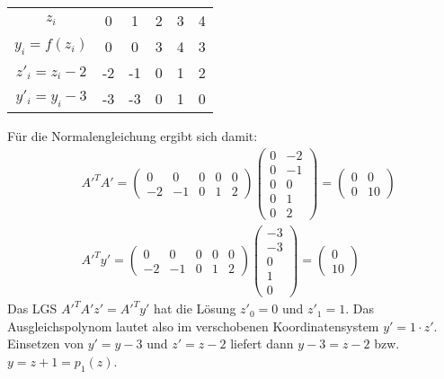 \begin{tabular}{c|ccccc}
  $z_i$ & 0 & 1 & 2 & 3 & 4\\
  $y_i = f(z_i)$ & 0 & 0 & 3 & 4 & 3 \\
  \hline
  $z'_i = z_i - 2$ & -2 & -1 & 0 & 1 & 2\\
  $y'_i = y_i - 3$ & -3 & -3 & 0 & 1 & 0
\end{tabular} \quad
Für die Normalengleichung ergibt sich damit:
\begin{align*}
  & A'^T A' =  \begin{pmatrix} 0 & 0 & 0 & 0 & 0 \\ -2 & -1 & 0 & 1 & 2 \end{pmatrix}
   \begin{pmatrix} 0 & -2 \\ 0 & -1 \\ 0 & 0 \\ 0 & 1 \\ 0 & 2 \end{pmatrix} =
   \begin{pmatrix} 0 & 0  \\ 0 & 10 \end{pmatrix} \\
  & A'^T y'= \begin{pmatrix} 0 & 0 & 0 & 0 & 0 \\ -2 & -1 & 0 & 1 & 2 \end{pmatrix}
   \begin{pmatrix} -3 \\ -3 \\ 0 \\ 1 \\ 0 \end{pmatrix} = \begin{pmatrix}0 \\10 \end{pmatrix}
\end{align*}
Das LGS $A'^T A' z' = A'^T y'$ hat die Lösung $z'_0 = 0$ und $z'_1 = 1$. Das
Ausgleichspolynom lautet also im verschobenen Koordinatensystem $y' = 1 \cdot z'$.
Einsetzen von $y' = y - 3$ und $z' = z - 2$ liefert dann $y - 3 = z - 2$ bzw. $y = z + 1 = p_1(z)$.



